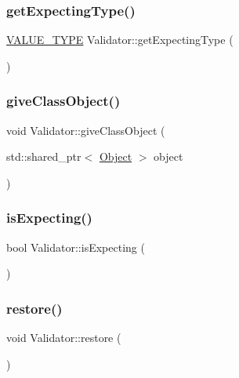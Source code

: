 \subsubsection{\texorpdfstring{get\+Expecting\+Type()}{getExpectingType()}}
{\footnotesize\ttfamily \hyperlink{statics_8h_a0674a913b8e8c8a9f265baab3646b565}{V\+A\+L\+U\+E\+\_\+\+T\+Y\+PE} Validator\+::get\+Expecting\+Type (\begin{DoxyParamCaption}{ }\end{DoxyParamCaption})}

\mbox{\label{classValidator_ad0a3d5e1c57840006e96c74c74eac0aa}} 
\subsubsection{\texorpdfstring{give\+Class\+Object()}{giveClassObject()}}
{\footnotesize\ttfamily void Validator\+::give\+Class\+Object (\begin{DoxyParamCaption}\item[{std\+::shared\+\_\+ptr$<$ \hyperlink{classObject}{Object} $>$}]{object }\end{DoxyParamCaption})}

\mbox{\label{classValidator_ab94d9925c577be6a8cad24a5a6b60db9}} 
\subsubsection{\texorpdfstring{is\+Expecting()}{isExpecting()}}
{\footnotesize\ttfamily bool Validator\+::is\+Expecting (\begin{DoxyParamCaption}{ }\end{DoxyParamCaption})}

\mbox{\label{classValidator_a0c89c0c840be87b9011cb518d7bc12ff}} 
\subsubsection{\texorpdfstring{restore()}{restore()}}
{\footnotesize\ttfamily void Validator\+::restore (\begin{DoxyParamCaption}{ }\end{DoxyParamCaption})}

